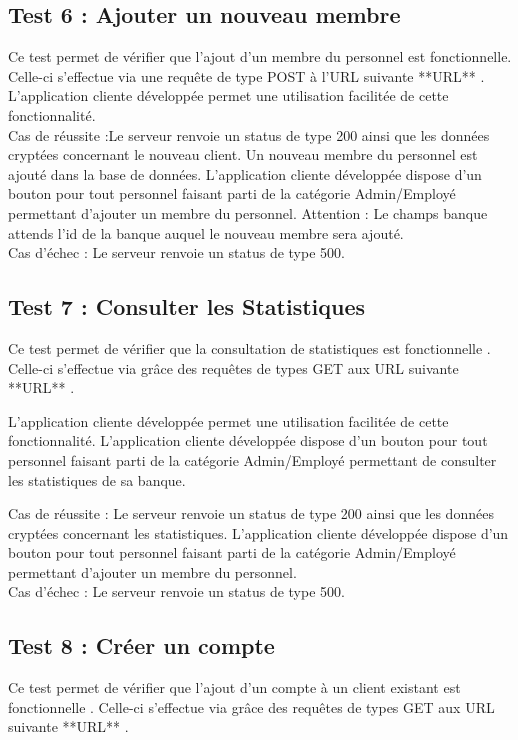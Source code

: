 \subsection{Test 6 : Ajouter un nouveau membre }

Ce test permet de vérifier que l'ajout d'un membre du personnel est fonctionnelle.
Celle-ci s'effectue via une requête de type POST à l'URL suivante **URL** .
\\
L'application cliente développée permet une utilisation facilitée de cette fonctionnalité. 
\\
Cas de réussite :Le serveur renvoie un status de type 200 ainsi que les données cryptées concernant le nouveau client. Un nouveau membre du personnel est ajouté dans la base de données.
L'application cliente développée dispose d'un bouton pour tout personnel faisant parti de la catégorie Admin/Employé permettant d'ajouter un membre du personnel.
Attention : Le champs banque attends l'id de la banque auquel le nouveau membre sera ajouté.
\\
Cas d'échec : Le serveur renvoie un status de type 500.

\subsection{Test 7 : Consulter les Statistiques}
Ce test permet de vérifier que la consultation de statistiques est fonctionnelle .
Celle-ci s'effectue via grâce des requêtes de types GET aux URL suivante **URL** .

L'application cliente développée permet une utilisation facilitée de cette fonctionnalité. 
L'application cliente développée dispose d'un bouton pour tout personnel faisant parti de la catégorie Admin/Employé permettant de consulter les statistiques de sa banque.

Cas de réussite : Le serveur renvoie un status de type 200 ainsi que les données cryptées concernant les statistiques.
L'application cliente développée dispose d'un bouton pour tout personnel faisant parti de la catégorie Admin/Employé permettant d'ajouter un membre du personnel.
\\
Cas d'échec : Le serveur renvoie un status de type 500.

\subsection{Test 8 : Créer un compte }

Ce test permet de vérifier que l'ajout d'un compte à un client existant est fonctionnelle .
Celle-ci s'effectue via grâce des requêtes de types GET aux URL suivante **URL** .

